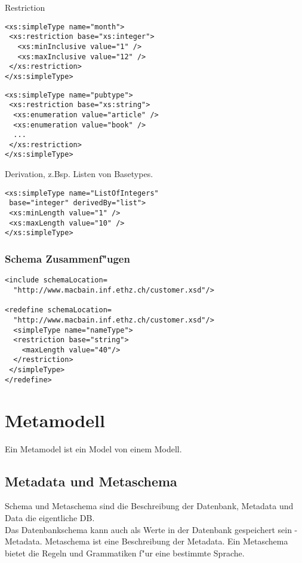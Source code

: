 \documentclass[german, 10pt, a4paper, twocolumn]{scrartcl}
\theoremstyle{definition}
\theoremstyle{remark}
\theoremstyle{example}
\begin{document}
Restriction

\begin{verbatim}
<xs:simpleType name="month">
 <xs:restriction base="xs:integer">
   <xs:minInclusive value="1" />
   <xs:maxInclusive value="12" />
 </xs:restriction>
</xs:simpleType>
\end{verbatim}

\begin{verbatim}
<xs:simpleType name="pubtype">
 <xs:restriction base="xs:string">
  <xs:enumeration value="article" />
  <xs:enumeration value="book" />
  ...
 </xs:restriction>
</xs:simpleType>		
\end{verbatim}

Derivation, z.Bsp. Listen von Basetypes.

\begin{verbatim}
<xs:simpleType name="ListOfIntegers"
 base="integer" derivedBy="list">
 <xs:minLength value="1" />
 <xs:maxLength value="10" />
</xs:simpleType>
\end{verbatim}

\subsubsection{Schema Zusammenf"ugen}

\begin{verbatim}
<include schemaLocation=
  "http://www.macbain.inf.ethz.ch/customer.xsd"/>

<redefine schemaLocation=
  "http://www.macbain.inf.ethz.ch/customer.xsd"/>
  <simpleType name="nameType">
  <restriction base="string">
    <maxLength value="40"/>
  </restriction>
 </simpleType>
</redefine>
\end{verbatim}

\section{Metamodell}

Ein Metamodel ist ein Model von einem Modell.

\subsection{Metadata und Metaschema}

Schema und Metaschema sind die Beschreibung der Datenbank, Metadata und Data die eigentliche DB.\\

Das Datenbankschema kann auch als Werte in der Datenbank gespeichert sein - Metadata. Metaschema ist eine Beschreibung der Metadata. Ein Metaschema bietet die Regeln und Grammatiken f"ur eine bestimmte Sprache.
\end{document}
